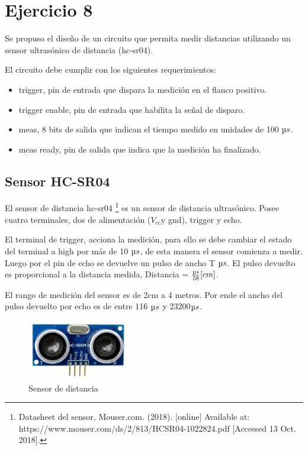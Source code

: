 \documentclass[../../e3_tp2_main.tex]{subfiles}
\begin{document}
\chapter{Ejercicio 8}

Se propuso el diseño de un circuito que permita medir distancias utilizando un sensor ultrasónico de distancia (hc-sr04).
\par El circuito debe cumplir con los siguientes requerimientos: 
\begin{itemize}  
\item trigger, pin de entrada que dispara la medición en el flanco positivo. 
\item trigger enable, pin de entrada que habilita la señal de disparo.
\item meas, 8 bits de salida que indican el tiempo medido en unidades de 100 $\micro s$.
\item meas ready, pin de salida que indica que la medición ha finalizado. 
\end{itemize}

\section{Sensor HC-SR04}

El sensor de distancia hc-sr04
\footnote{Datasheet del sensor, Mouser.com. (2018). [online] Available at: https://www.mouser.com/ds/2/813/HCSR04-1022824.pdf [Accessed 13 Oct. 2018].}
 es un sensor de distancia ultrasónico. Posee cuatro terminales, dos de alimentación ($V_{cc}$y gnd), trigger y echo.
\par El terminal de trigger, acciona la medición, para ello se debe cambiar el estado del terminal a high por más de 10 $\micro s$, de esta manera el sensor comienza a medir. Luego por el pin de echo se devuelve un pulso de ancho T $\micro s$.
 El pulso devuelto es proporcional a  la distancia medida, Distancia = $ \frac {\micro s}{58}[cm]$.
\par El rango de medición del sensor es de 2cm a 4 metros. Por ende el ancho del pulso devuelto por echo es de entre 116 $\micro s$ y 23200$\micro s$.
\begin{figure}[H]	
	\centering
	\includegraphics[width=0.4\textwidth]{imagenes/sensor.jpg}
	\caption{Sensor de distancia}
\end{figure}
\end{document}
